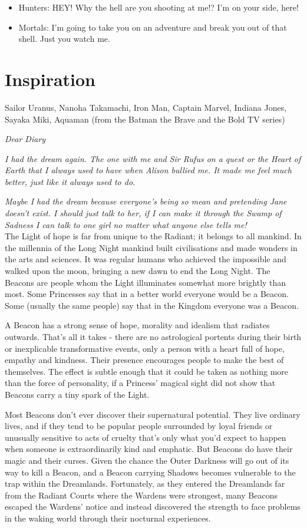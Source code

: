 \begin{itemize}
\item Hunters: HEY! Why the hell are you shooting at me!? I'm on your side, here!
\item Mortals: I'm going to take you on an adventure and break you out of that shell. Just you watch me. 
\end{itemize}

\section*{Inspiration}
Sailor Uranus, Nanoha Takamachi, Iron Man, Captain Marvel, Indiana Jones, Sayaka Miki, Aquaman (from the Batman the Brave and the Bold TV series)

\newpage{}
\noindent \textit{Dear Diary}

\textit{I had the dream again. The one with me and Sir Rufus on a quest or the Heart of Earth that I always used to have when Alison bullied me. It made me feel much better, just like it always used to do.}

\textit{Maybe I had the dream because everyone's being so mean and pretending Jane doesn't exist. I should just talk to her, if I can make it through the Swamp of Sadness I can talk to one girl no matter what anyone else tells me!}\\

\noindent The Light of hope is far from unique to the Radiant; it belongs to all mankind. In the millennia of the Long Night mankind built civilisations and made wonders in the arts and sciences. It was regular humans who achieved the impossible and walked upon the moon, bringing a new dawn to end the Long Night. The Beacons are people whom the Light illuminates somewhat more brightly than most. Some Princesses say that in a better world everyone would be a Beacon. Some (usually the same people) say that in the Kingdom everyone was a Beacon.

A Beacon has a strong sense of hope, morality and idealism that radiates outwards. That’s all it takes - there are no astrological portents during their birth or inexplicable transformative events, only a person with a heart full of hope, empathy and kindness. Their presence encourages people to make the best of themselves. The effect is subtle enough that it could be taken as nothing more than the force of personality, if a Princess' magical sight did not show that Beacons carry a tiny spark of the Light.

Most Beacons don’t ever discover their supernatural potential. They live ordinary lives, and if they tend to be popular people surrounded by loyal friends or unusually sensitive to acts of cruelty that’s only what you'd expect to happen when someone is extraordinarily kind and emphatic. But Beacons do have their magic and their curses. Given the chance the Outer Darkness will go out of its way to kill a Beacon, and a Beacon carrying Shadows becomes vulnerable to the trap within the Dreamlands. Fortunately, as they entered the Dreamlands far from the Radiant Courts where the Wardens were strongest, many Beacons escaped the Wardens’ notice and instead discovered the strength to face problems in the waking world through their nocturnal experiences. 


